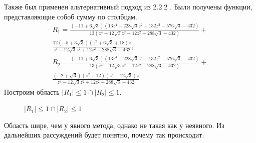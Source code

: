 \documentclass[a4paper,article,14pt]{extarticle}
\begin{document}
Также был применен альтернативный подход из 2.2.2 \cite{stability}.
Были получены функции, представляющие собоб сумму по столбцам.
\begin{equation}
\begin{gathered}
R_{1} = \frac{(-11 + 6\sqrt{3})(13 z^{4} - 228\sqrt{3} z^{2} - 132 z^{2} - 576 \sqrt{3} - 432)}{13 (z^{4} - 12 \sqrt{3} z^{2} + 12 z^{2} + 288\sqrt{3} - 432)} + \\ \frac{12 (-5 + 3\sqrt{3}) (z^{2} + 6\sqrt{3} + 18) z}{z^{4} - 12\sqrt{3} z^{2} + 12 z^{2} + 288\sqrt{3} - 432}, \\
R_{2} = \frac{(-11 + 6\sqrt{3}) (13 z^{4} - 228\sqrt{3} z^{2} - 132 z^{2} - 576\sqrt{3} - 432)}{13 (z^{4} - 12\sqrt{3} z^{2} + 12 z^{2} + 288\sqrt{3} - 432)} + \\ \frac{(-2 + \sqrt{3}) (z^{2} + 12) (z^{2} - 12\sqrt{3}) z}{z^{4} - 12\sqrt{3} z^{2} + 12 z^{2} + 288\sqrt{3} - 432}
\end{gathered}
\end{equation}
Построим область $\lvert R_{1} \rvert \leq 1 \cap \lvert R_{2} \rvert \leq 1$.

\begin{figure}[ht]
\begin{center}
\caption{
\label{stab_area_another}
     $\lvert R_{1} \rvert \leq 1 \cap \lvert R_{2} \rvert \leq 1$}
\end{center}
\end{figure}

Область шире, чем у явного метода, однако не такая как у неявного. Из дальнейших рассуждений будет понятно, почему так происходит. 
\pagebreak
\end{document}
